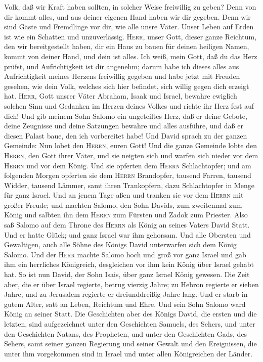Volk, daß wir Kraft haben sollten, in solcher Weise freiwillig zu geben?
Denn von dir kommt alles, und aus deiner eigenen Hand haben wir dir
gegeben.  Denn wir sind Gäste und Fremdlinge vor dir, wie
alle unsre Väter. Unser Leben auf Erden ist wie ein Schatten und
unzuverlässig.  \textsc{Herr}, unser Gott, dieser ganze
Reichtum, den wir bereitgestellt haben, dir ein Haus zu bauen für deinen
heiligen Namen, kommt von deiner Hand, und dein ist alles.
 Ich weiß, mein Gott, daß du das Herz prüfst, und
Aufrichtigkeit ist dir angenehm; darum habe ich dieses alles aus
Aufrichtigkeit meines Herzens freiwillig gegeben und habe jetzt mit
Freuden gesehen, wie dein Volk, welches sich hier befindet, sich willig
gegen dich erzeigt hat.  \textsc{Herr}, Gott unsrer Väter
Abraham, Isaak und Israel, bewahre ewiglich solchen Sinn und Gedanken im
Herzen deines Volkes und richte ihr Herz fest auf dich! 
Und gib meinem Sohn Salomo ein ungeteiltes Herz, daß er deine Gebote,
deine Zeugnisse und deine Satzungen bewahre und alles ausführe, und daß
er diesen Palast baue, den ich vorbereitet habe!  Und
David sprach zu der ganzen Gemeinde: Nun lobet den \textsc{Herrn}, euren
Gott! Und die ganze Gemeinde lobte den \textsc{Herrn}, den Gott ihrer
Väter, und sie neigten sich und warfen sich nieder vor dem
\textsc{Herrn} und vor dem König.  Und sie opferten dem
\textsc{Herrn} Schlachtopfer; und am folgenden Morgen opferten sie dem
\textsc{Herrn} Brandopfer, tausend Farren, tausend Widder, tausend
Lämmer, samt ihren Trankopfern, dazu Schlachtopfer in Menge für ganz
Israel.  Und an jenem Tage aßen und tranken sie vor dem
\textsc{Herrn} mit großer Freude; und machten Salomo, den Sohn Davids,
zum zweitenmal zum König und salbten ihn dem \textsc{Herrn} zum Fürsten
und Zadok zum Priester.  Also saß Salomo auf dem Throne
des \textsc{Herrn} als König an seines Vaters David Statt. Und er hatte
Glück; und ganz Israel war ihm gehorsam.  Und alle
Obersten und Gewaltigen, auch alle Söhne des Königs David unterwarfen
sich dem König Salomo.  Und der \textsc{Herr} machte
Salomo hoch und groß vor ganz Israel und gab ihm ein herrliches
Königreich, desgleichen vor ihm kein König über Israel gehabt hat.
 So ist nun David, der Sohn Isais, über ganz Israel König
gewesen.  Die Zeit aber, die er über Israel regierte,
betrug vierzig Jahre; zu Hebron regierte er sieben Jahre, und zu
Jerusalem regierte er dreiunddreißig Jahre lang.  Und er
starb in gutem Alter, satt an Leben, Reichtum und Ehre. Und sein Sohn
Salomo ward König an seiner Statt.  Die Geschichten aber
des Königs David, die ersten und die letzten, sind aufgezeichnet unter
den Geschichten Samuels, des Sehers, und unter den Geschichten Natans,
des Propheten, und unter den Geschichten Gads, des Sehers,
 samt seiner ganzen Regierung und seiner Gewalt und den
Ereignissen, die unter ihm vorgekommen sind in Israel und unter allen
Königreichen der Länder.
